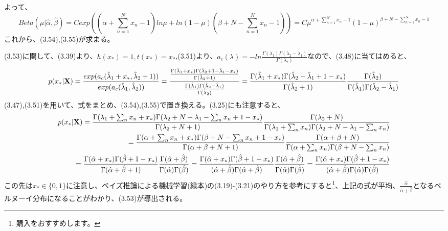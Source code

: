 \documentclass{jsarticle}
\begin{document}
よって、
\begin{equation}
Beta(\mu | \hat{\alpha}, \hat{\beta}) = C exp((\alpha + \sum_{n = 1}^N x_n - 1)ln \mu + ln (1 - \mu)(\beta + N - \sum_{n = 1}^N x_n - 1)) = C \mu^{\alpha + \sum_{n = 1}^N x_n - 1}(1-\mu)^{\beta + N - \sum_{n = 1}^N x_n - 1}
\end{equation}
これから、(3.54),(3.55)が求まる。

(3.53)に関して、(3.39)より、$h(x_*)=1, t(x_*)=x_*$,(3.51)より、$a_c(\lambda)=-ln \frac{\Gamma(\lambda_1)\Gamma(\lambda_2 - \lambda_1)}{\Gamma(\lambda_2)}$なので、(3.48)に当てはめると、
\begin{equation}
p(x_*|{\bf X}) = \frac{exp(a_c(\hat{\lambda}_1 + x_*, \hat{\lambda}_2 + 1))}{exp(a_c(\hat{\lambda}_1, \hat{\lambda}_2))}=\frac{\frac{\Gamma(\hat{\lambda}_1 + x_*)\Gamma(\hat{\lambda}_2 + 1 - \hat{\lambda}_1 - x_*)}{\Gamma(\hat{\lambda}_2 + 1)}}{\frac{\Gamma(\hat{\lambda}_1)\Gamma(\hat{\lambda}_2 - \hat{\lambda}_1)}{\Gamma(\hat{\lambda}_2)}}
=\frac{\Gamma(\hat{\lambda}_1 + x_*)\Gamma(\hat{\lambda}_2 - \hat{\lambda}_1 + 1 - x_*)}{\Gamma(\hat{\lambda}_2 + 1)}\frac{\Gamma(\hat{\lambda}_2)}{\Gamma(\hat{\lambda}_1)\Gamma(\hat{\lambda}_2 - \hat{\lambda}_1)}
\end{equation}
(3.47),(3.51)を用いて、式をまとめ、(3.54),(3.55)で置き換える。(3.25)にも注意すると、
\begin{equation}
\begin{split}
p(x_*|{\bf X})
=\frac{\Gamma(\lambda_1 + \sum_n x_n + x_*)\Gamma(\lambda_2 + N - \lambda_1 - \sum_n x_n + 1 - x_*)}{\Gamma(\lambda_2 + N + 1)}\frac{\Gamma(\lambda_2 + N)}{\Gamma(\lambda_1 + \sum_n x_n)\Gamma(\lambda_2 + N - \lambda_1 - \sum_n x_n)}\\
=\frac{\Gamma(\alpha + \sum_n x_n + x_*)\Gamma(\beta + N - \sum_n x_n + 1 - x_*)}{\Gamma(\alpha + \beta + N + 1)}\frac{\Gamma(\alpha + \beta + N)}{\Gamma(\alpha + \sum_n x_n)\Gamma(\beta + N - \sum_n x_n)}\\
=\frac{\Gamma(\hat{\alpha} + x_*)\Gamma(\hat{\beta} + 1 - x_*)}{\Gamma(\hat{\alpha} + \hat{\beta} + 1)}\frac{\Gamma(\hat{\alpha} + \hat{\beta})}{\Gamma(\hat{\alpha})\Gamma(\hat{\beta})}
=\frac{\Gamma(\hat{\alpha} + x_*)\Gamma(\hat{\beta} + 1 - x_*)}{(\hat{\alpha} + \hat{\beta})\Gamma(\hat{\alpha} + \hat{\beta})}\frac{\Gamma(\hat{\alpha} + \hat{\beta})}{\Gamma(\hat{\alpha})\Gamma(\hat{\beta})}
=\frac{\Gamma(\hat{\alpha} + x_*)\Gamma(\hat{\beta} + 1 - x_*)}{(\hat{\alpha} + \hat{\beta})\Gamma(\hat{\alpha})\Gamma(\hat{\beta})}\\
\end{split}
\end{equation}
この先は$x_* \in \{0, 1\}$に注意し、ベイズ推論による機械学習(緑本)の(3.19)-(3.21)のやり方を参考にすると\footnote{購入をおすすめします。}、上記の式が平均、$\frac{\hat{\alpha}}{\hat{\alpha} + \hat{\beta}}$となるベルヌーイ分布になることがわかり、(3.53)が導出される。
\end{document}
